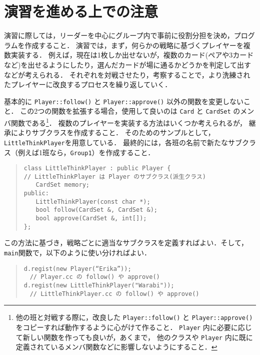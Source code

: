 \section*{演習を進める上での注意}
演習に際しては，リーダーを中心にグループ内で事前に役割分担を決め，プログラムを作成すること．
演習では，まず，何らかの戦略に基づくプレイヤーを複数実装する．
例えば，現在は1枚しか出せないが，複数のカード(ペアや3カードなど)を出せるようにしたり，選んだカードが場に通るかどうかを判定して出すなどが考えられる．
それぞれを対戦させたり，考察することで，より洗練されたプレイヤーに改良するプロセスを繰り返していく．

基本的に \verb+Player::follow()+ と \verb+Player::approve()+ 以外の関数を変更しないこと．
この2つの関数を拡張する場合，使用して良いのは \verb+Card+ と  \verb+CardSet+ のメンバ関数である\footnote{他の班と対戦する際に，改良した \verb+Player::follow()+ と \verb+Player::approve()+ をコピーすれば動作するように心がけて作ること． \verb+Player+ 内に必要に応じて新しい関数を作っても良いが，あくまで， 他のクラスや \verb+Player+ 内に既に定義されているメンバ関数などに影響しないようにすること．}．
複数のプレイヤーを実装する方法はいくつか考えられるが，
継承によりサブクラスを作成すること．
そのためのサンプルとして，\verb+LittleThinkPlayer+を用意している．
最終的には，各班の名前で新たなサブクラス（例えば1班なら，\verb+Group1+）を作成すること．
\begin{quote}
\begin{verbatim}
class LittleThinkPlayer : public Player {
// LittleThinkPlayer は Player のサブクラス(派生クラス)
　　CardSet memory;
public:
　　LittleThinkPlayer(const char *);
　　bool follow(CardSet &, CardSet &);
　　bool approve(CardSet &, int[]);
};
\end{verbatim}
\end{quote}
この方法に基づき，戦略ごとに適当なサブクラスを定義すればよい．そして，\verb+main+関数で，以下のように使い分ければよい．
\begin{quote}
\begin{verbatim}
d.regist(new Player(“Erika”)); 　
　// Player.cc の follow() や approve() 
d.regist(new LittleThinkPlayer("Warabi")); 
　// LittleThinkPlayer.cc の follow() や approve() 
\end{verbatim}
\end{quote}

